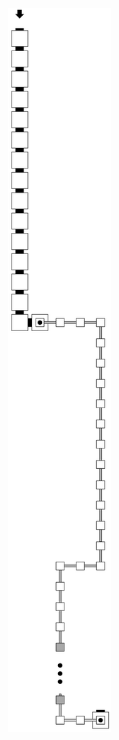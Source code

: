 \begin{figure}[H]
    \centering
    \begin{subfigure}[t]{0.3\textwidth}
        \centering
        \includegraphics[width=0.3\textwidth]{return_paths/read_next_1-or-2_op}

\end{subfigure}
\end{figure}
